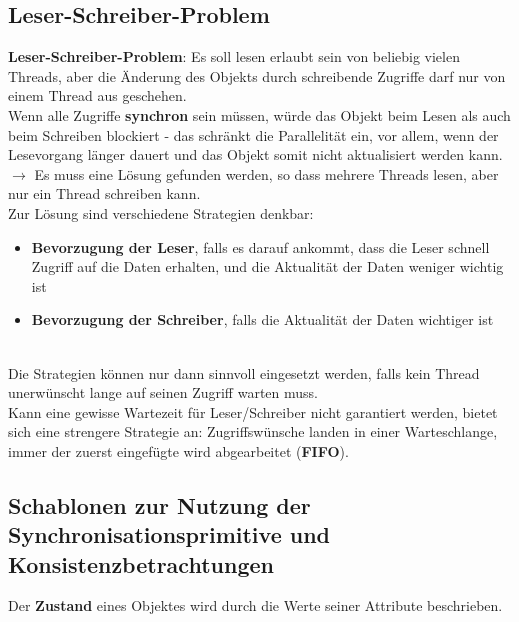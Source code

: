 \subsection{Leser-Schreiber-Problem}\label{subsec:readerwriterproblem}

\textbf{Leser-Schreiber-Problem}: Es soll lesen erlaubt sein von beliebig vielen Threads, aber die Änderung des Objekts durch schreibende Zugriffe darf nur von einem Thread aus geschehen.\\

\noindent
Wenn alle Zugriffe \textbf{synchron} sein müssen, würde das Objekt beim Lesen als auch beim Schreiben blockiert - das schränkt die Parallelität ein, vor allem, wenn der Lesevorgang länger dauert und das Objekt somit nicht aktualisiert werden kann.\\

\noindent
$\rightarrow$ Es muss eine Lösung gefunden werden, so dass mehrere Threads lesen, aber nur ein Thread schreiben kann.\\

\noindent
Zur Lösung sind verschiedene Strategien denkbar:

\begin{itemize}
    \item \textbf{Bevorzugung der Leser}, falls es darauf ankommt, dass die Leser schnell Zugriff auf die Daten erhalten, und die Aktualität der Daten weniger wichtig ist
    \item \textbf{Bevorzugung der Schreiber}, falls die Aktualität der Daten wichtiger ist
\end{itemize}\\

\noindent
Die Strategien können nur dann sinnvoll eingesetzt werden, falls kein Thread unerwünscht lange auf seinen Zugriff warten muss.\\
Kann eine gewisse Wartezeit für Leser/Schreiber nicht garantiert werden, bietet sich eine strengere Strategie an: Zugriffswünsche landen in einer Warteschlange, immer der zuerst eingefügte wird abgearbeitet (\textbf{FIFO}).


\subsection{Schablonen zur Nutzung der Synchronisationsprimitive und Konsistenzbetrachtungen}

Der \textbf{Zustand} eines Objektes wird durch die Werte seiner Attribute beschrieben.\\

